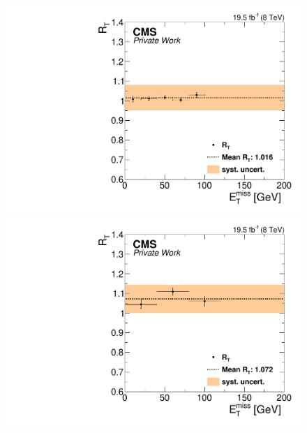 \begin{figure}[htbp]
\begin{minipage}[t]{0.49\textwidth}
\end{minipage}
\begin{minipage}[t]{0.49\textwidth}
  \includegraphics[width=\textwidth]{plots/BG/trigger/Triggereff_SFvsOF_Syst_AlphaT_HighHTExclusiveCentral_Full2012_MET_None.pdf}
\end{minipage}
\begin{minipage}[t]{0.49\textwidth}
\includegraphics[width=\textwidth]{plots/BG/trigger/Triggereff_SFvsOF_Syst_AlphaT_HighHTExclusiveForward_Full2012_MET_None.pdf}
\end{minipage}
\begin{minipage}[t]{0.49\textwidth}

\end{minipage}
\end{figure}
